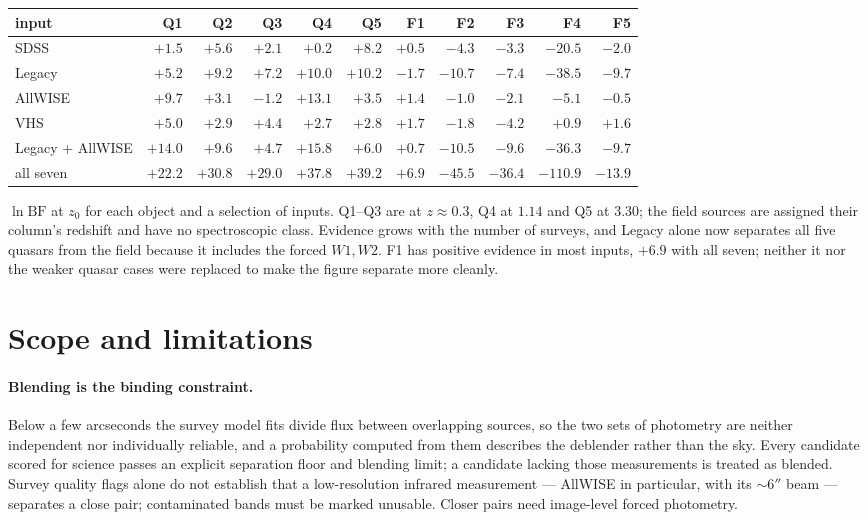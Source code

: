\documentclass[11pt,a4paper]{article}
\begin{document}
\begin{center}
\footnotesize
\setlength{\tabcolsep}{4pt}
\begin{tabular}{@{}lrrrrrrrrrr@{}}
\toprule
input & Q1 & Q2 & Q3 & Q4 & Q5 & F1 & F2 & F3 & F4 & F5 \\
\midrule
SDSS             & $+1.5$ & $+5.6$ & $+2.1$ & $+0.2$ & $+8.2$ & $+0.5$ & $-4.3$ & $-3.3$ & $-20.5$ & $-2.0$ \\
Legacy           & $+5.2$ & $+9.2$ & $+7.2$ & $+10.0$ & $+10.2$ & $-1.7$ & $-10.7$ & $-7.4$ & $-38.5$ & $-9.7$ \\
AllWISE          & $+9.7$ & $+3.1$ & $-1.2$ & $+13.1$ & $+3.5$ & $+1.4$ & $-1.0$ & $-2.1$ & $-5.1$ & $-0.5$ \\
VHS              & $+5.0$ & $+2.9$ & $+4.4$ & $+2.7$ & $+2.8$ & $+1.7$ & $-1.8$ & $-4.2$ & $+0.9$ & $+1.6$ \\
Legacy + AllWISE & $+14.0$ & $+9.6$ & $+4.7$ & $+15.8$ & $+6.0$ & $+0.7$ & $-10.5$ & $-9.6$ & $-36.3$ & $-9.7$ \\
all seven        & $+22.2$ & $+30.8$ & $+29.0$ & $+37.8$ & $+39.2$ & $+6.9$ & $-45.5$ & $-36.4$ & $-110.9$ & $-13.9$ \\
\bottomrule
\end{tabular}
\end{center}

\noindent
$\ln\mathrm{BF}$ at $z_0$ for each object and a selection of inputs. Q1--Q3
are at $z\approx0.3$, Q4 at $1.14$ and Q5 at $3.30$; the field sources are
assigned their column's redshift and have no spectroscopic class. Evidence grows
with the number of surveys, and Legacy alone now separates all five quasars from
the field because it includes the forced $W1,W2$. F1 has positive evidence in
most inputs, $+6.9$ with all seven; neither it nor the weaker quasar cases were
replaced to make the figure separate more cleanly.

\section{Scope and limitations}
\label{sec:limitations}

\paragraph{Blending is the binding constraint.} Below a few arcseconds the survey
model fits divide flux between overlapping sources, so the two sets of
photometry are neither independent nor individually reliable, and a
probability computed from them describes the deblender rather than the sky.
Every candidate scored for science passes an explicit separation floor and
blending limit; a candidate lacking those measurements is treated as blended.
Survey quality flags alone do not establish that a low-resolution infrared
measurement --- AllWISE in particular, with its $\sim6''$ beam --- separates a
close pair; contaminated bands must be marked unusable. Closer pairs need
image-level forced photometry.
\end{document}
